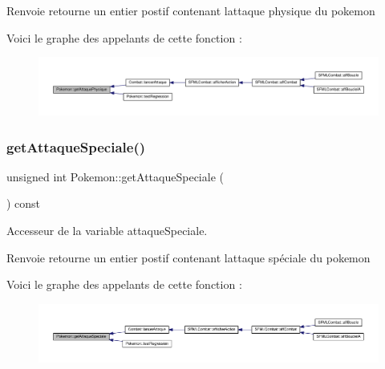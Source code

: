 \begin{DoxyReturn}{Renvoie}
retourne un entier postif contenant l\textquotesingle{}attaque physique du pokemon 
\end{DoxyReturn}
Voici le graphe des appelants de cette fonction \+:\nopagebreak
\begin{figure}[H]
\begin{center}
\leavevmode
\includegraphics[width=350pt]{class_pokemon_a27ae3d139d0c958b2f605743eb8f8a6d_icgraph}
\end{center}
\end{figure}
\mbox{\label{class_pokemon_ace1c2940d8870b907cc2b0cd29f6efba}} 
\subsubsection{\texorpdfstring{get\+Attaque\+Speciale()}{getAttaqueSpeciale()}}
{\footnotesize\ttfamily unsigned int Pokemon\+::get\+Attaque\+Speciale (\begin{DoxyParamCaption}{ }\end{DoxyParamCaption}) const}



Accesseur de la variable attaque\+Speciale. 

\begin{DoxyReturn}{Renvoie}
retourne un entier postif contenant l\textquotesingle{}attaque spéciale du pokemon 
\end{DoxyReturn}
Voici le graphe des appelants de cette fonction \+:\nopagebreak
\begin{figure}[H]
\begin{center}
\leavevmode
\includegraphics[width=350pt]{class_pokemon_ace1c2940d8870b907cc2b0cd29f6efba_icgraph}
\end{center}
\end{figure}
\mbox{\label{class_pokemon_a90e8c3b16d39995fcbcfd01834f57be7}} 
